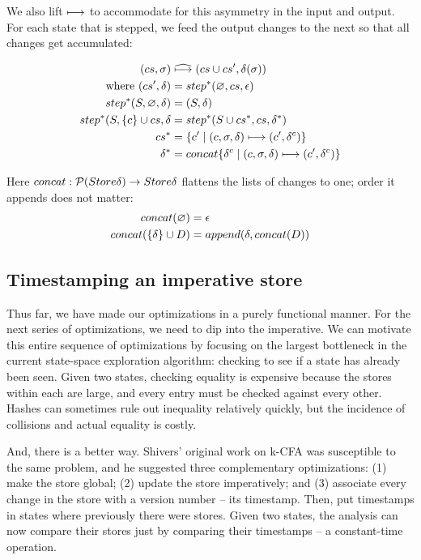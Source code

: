 \documentclass[preprint,onecolumn,9pt]{sigplanconf} %
\begin{document}
We also lift $\longmapsto$ to accommodate for this asymmetry
in the input and output. For each state that is stepped, we feed the
output changes to the next so that all changes get accumulated:

\begin{align*}
(cs, \sigma) &\mathrel{\widehat{\longmapsto}} (cs\cup cs', \delta(\sigma)) \\
\mbox{ where } (cs', \delta) &= step^*(\varnothing, cs, \epsilon) \\
step^*(S, \varnothing, \delta) &= (S, \delta) \\
step^*(S, \{c\}\cup cs, \delta &= step^*(S\cup cs^*, cs, \delta^*) \\
cs^* &= \{c' \mid (c,\sigma,\delta) \longmapsto (c',\delta^c) \} \\
\delta^* &= concat\{\delta^c \mid (c, \sigma,\delta) \longmapsto (c', \delta^c)\}
\end{align*}

Here $concat : \mathcal{P}(Store\delta) \to Store\delta$ flattens the lists
of changes to one; order it appends does not matter:
\begin{align*}
concat(\varnothing) &= \epsilon \\
concat(\{\delta\}\cup D) &= append(\delta, concat(D))
\end{align*}


\subsection{Timestamping an imperative store}


Thus far, we have made our optimizations in a purely functional
manner. For the next series of optimizations, we need to dip into the
imperative. We can motivate this entire sequence of optimizations by
focusing on the largest bottleneck in the current state-space
exploration algorithm: checking to see if a state has already been
seen. Given two states, checking equality is expensive because the
stores within each are large, and every entry must be checked against
every other. Hashes can sometimes rule out inequality relatively
quickly, but the incidence of collisions and actual equality is
costly.

And, there is a better way. Shivers' original work on k-CFA was
susceptible to the same problem, and he suggested three complementary
optimizations: (1) make the store global; (2) update the store
imperatively; and (3) associate every change in the store with a
version number -- its timestamp. Then, put timestamps in states
where previously there were stores. Given two states, the analysis can
now compare their stores just by comparing their timestamps -- a
constant-time operation.
\end{document}
